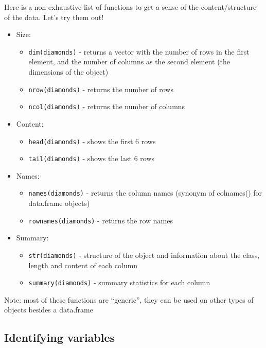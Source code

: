\documentclass[
  letterpaper,
  DIV=11,
  numbers=noendperiod,
  oneside]{scrreprt}
\providecommand{\tightlist}{%
  \setlength{\itemsep}{0pt}\setlength{\parskip}{0pt}}\usepackage{longtable,booktabs,array}
\begin{document}
Here is a non-exhaustive list of functions to get a sense of the
content/structure of the data. Let's try them out!

\begin{itemize}
\tightlist
\item
  Size:

  \begin{itemize}
  \tightlist
  \item
    \texttt{dim(diamonds)} - returns a vector with the number of rows in
    the first element, and the number of columns as the second element
    (the dimensions of the object)
  \item
    \texttt{nrow(diamonds)} - returns the number of rows
  \item
    \texttt{ncol(diamonds)} - returns the number of columns
  \end{itemize}
\item
  Content:

  \begin{itemize}
  \tightlist
  \item
    \texttt{head(diamonds)} - shows the first 6 rows
  \item
    \texttt{tail(diamonds)} - shows the last 6 rows
  \end{itemize}
\item
  Names:

  \begin{itemize}
  \tightlist
  \item
    \texttt{names(diamonds)} - returns the column names (synonym of
    colnames() for data.frame objects)
  \item
    \texttt{rownames(diamonds)} - returns the row names
  \end{itemize}
\item
  Summary:

  \begin{itemize}
  \tightlist
  \item
    \texttt{str(diamonds)} - structure of the object and information
    about the class, length and content of each column
  \item
    \texttt{summary(diamonds)} - summary statistics for each column
  \end{itemize}
\end{itemize}

Note: most of these functions are ``generic'', they can be used on other
types of objects besides a data.frame

\subsection{Identifying variables}\label{identifying-variables}
\end{document}
